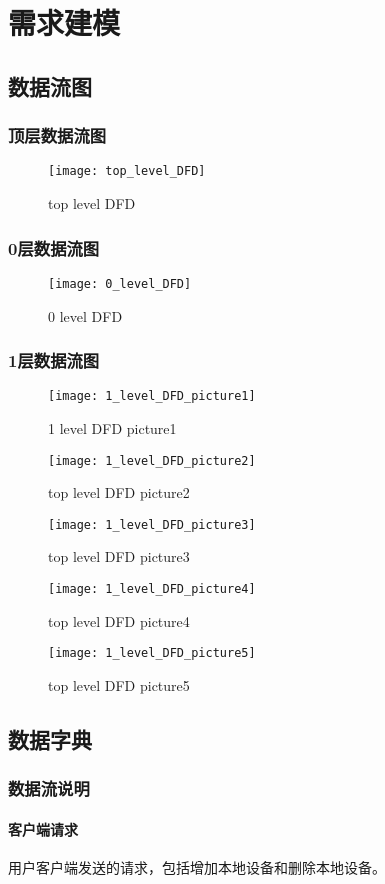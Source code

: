 \chapter{需求建模 }
\section{数据流图}
\subsection{顶层数据流图}
\begin{figure}[h]
	\centering
	\texttt{[image: top\_level\_DFD]}
	\caption{top level DFD} \label{fig:figure2}
\end{figure}

\subsection{0层数据流图}
\begin{figure}[h]
	\centering
	\texttt{[image: 0\_level\_DFD]}
	\caption{0 level DFD} \label{fig:figure3}
\end{figure}

\subsection{1层数据流图}
\begin{figure}[h]
	\centering
	\texttt{[image: 1\_level\_DFD\_picture1]}
	\caption{1 level DFD picture1} \label{fig:figure4}
	\texttt{[image: 1\_level\_DFD\_picture2]}
	\caption{top level DFD picture2} \label{fig:figure5}
\end{figure}
\begin{figure}[h]
	\centering
	\texttt{[image: 1\_level\_DFD\_picture3]}
	\caption{top level DFD picture3} \label{fig:figure6}
	\texttt{[image: 1\_level\_DFD\_picture4]}
	\caption{top level DFD picture4} \label{fig:figure7}
	\texttt{[image: 1\_level\_DFD\_picture5]}
	\caption{top level DFD picture5} \label{fig:figure8}
\end{figure}

\section{数据字典}
\subsection{数据流说明}
\subsubsection{客户端请求}
用户客户端发送的请求，包括增加本地设备和删除本地设备。

